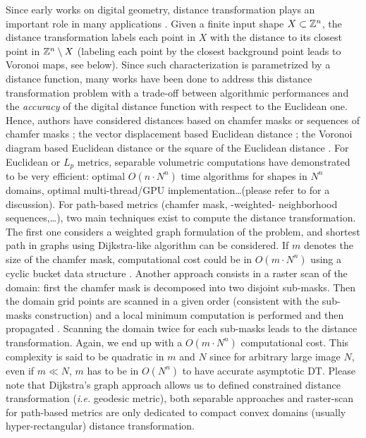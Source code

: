 \documentclass{llncs}
\begin{document}
Since early works on digital geometry, distance transformation plays
an important role in many applications
\cite{Rosenfeld1966,Rosenfeld1968}. Given a finite input shape
$X\subset {\mathbb{Z}}^n$, the distance transformation labels each point in $X$
with the distance to its closest point in ${\mathbb{Z}}^n \setminus X$ (labeling
each point by the closest background point leads to Voronoi maps, see
below). Since such characterization is parametrized by a distance
function, many works have been done to address this distance
transformation problem with a trade-off between algorithmic
performances and the \emph{accuracy} of the digital distance function
with respect to the Euclidean one.  Hence, authors have considered
distances based on chamfer masks
\cite{Rosenfeld1968,borgefors,fouard:ivc:2005} or sequences of chamfer
masks \cite{ROSEN_66,mukherjee,Strand2008,DBLP:conf/dgci/NormandSE13};
the vector displacement based Euclidean distance
\cite{danielson,ragnemalm}; the Voronoi diagram based Euclidean
distance \cite{BreuEtAl95,maurer_pami} or the square of the Euclidean
distance \cite{Hirata,roerdnik}.  For Euclidean or $L_p$ metrics,
separable volumetric computations have demonstrated to be very
efficient: optimal $O(n\cdot N^n)$ time algorithms for shapes in $N^n$
domains, optimal multi-thread/GPU implementation\ldots (please refer
to \cite{dcoeurjo_ChapDTWADGMM} for a discussion). For path-based
metrics (chamfer mask, -weighted- neighborhood sequences,\ldots), two
main techniques exist to compute the distance transformation. The
first one considers a weighted graph formulation of the problem, and
shortest path in graphs using Dijkstra-like algorithm can be
considered. If $m$ denotes the size of the chamfer mask, computational
cost could be in $O(m\cdot N^n)$ using a cyclic bucket data structure
\cite{verwer_uniform}. Another approach consists in a raster scan of
the domain: first the chamfer mask is decomposed into two disjoint
sub-masks. Then the domain grid points are scanned in a given order
(consistent with the sub-masks construction) and a local minimum
computation is performed and then propagated
\cite{ROSEN_66,borgefors}. Scanning the domain twice for each
sub-masks leads to the distance transformation. Again, we end up with
a $O(m\cdot N^n)$ computational cost. This complexity is said to be
quadratic in $m$ and $N$ since for arbitrary large image $N$, even if
$m \ll N$, $m$ has to be in $O(N^n)$ to have accurate asymptotic DT.
Please note that Dijkstra's graph approach allows us to defined
constrained distance transformation (\emph{i.e.} geodesic metric),
both separable approaches and raster-scan for path-based metrics are
only dedicated to compact convex domains (usually hyper-rectangular)
distance transformation.
\end{document}
